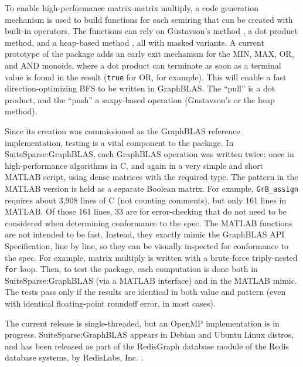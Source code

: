 To enable high-performance matrix-matrix multiply, a code generation mechanism
is used to build functions for each semiring that can be created with built-in
operators.  The functions can rely on Gustavson's method \cite{Gustavson78}, a
dot product method, and a heap-based method \cite{sisc3dspgemm}, all with
masked variants.  A current prototype of the package adds an early exit
mechanism for the MIN, MAX, OR, and AND monoids, where a dot product can
terminate as soon as a terminal value is found in the result (\verb'true' for
OR, for example).  This will enable a fast direction-optimizing BFS
\cite{Beamer:2012:DOB} to be written in GraphBLAS.  The ``pull'' is a dot
product, and the ``push'' a saxpy-based operation (Gustavson's or the heap
method).

Since its creation was commissioned as the GraphBLAS reference implementation,
testing is a vital component to the package.  In SuiteSparse:GraphBLAS, each
GraphBLAS operation was written twice: once in high-performance algorithms in
C, and again in a very simple and short MATLAB script, using dense matrices
with the required type.  The pattern in the MATLAB version is held as a
separate Boolean matrix.  For example, \verb'GrB_assign' requires about 3,908
lines of C (not counting comments), but only 161 lines in MATLAB. Of those 161
lines, 33 are for error-checking that do not need to be considered when
determining conformance to the spec.  The MATLAB functions are not intended to
be fast.  Instead, they exactly mimic the GraphBLAS API Specification, line by
line, so they can be visually inspected for conformance to the spec.  For
example, matrix multiply is written with a brute-force triply-nested \verb'for'
loop.  Then, to test the package, each computation is done both in
SuiteSparse:GraphBLAS (via a MATLAB interface) and in the MATLAB mimic.  The
tests pass only if the results are identical in both value and pattern (even
with identical floating-point roundoff error, in most cases).

The current release is single-threaded, but an OpenMP implementation is in
progress.  SuiteSparse:GraphBLAS appears in Debian and Ubuntu Linux distros,
and has been released as part of the RedisGraph database module of the Redis
database systems, by RedisLabs, Inc. \cite{redisgraph}.


